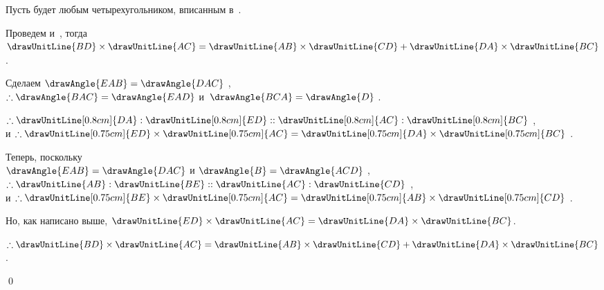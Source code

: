 \documentclass[letters,booklanguage=russian]{byrnebook}
\begin{document}
\begin{center}
Пусть  будет любым четырехугольником, вписанным в~.

Проведем  и~, тогда $\drawUnitLine{BD} \times \drawUnitLine{AC} = \drawUnitLine{AB} \times \drawUnitLine{CD} + \drawUnitLine{DA} \times \drawUnitLine{BC}$.

Сделаем $\drawAngle{EAB} = \drawAngle{DAC}$ ,\\
$\therefore \drawAngle{BAC} = \drawAngle{EAD}$ и~$\drawAngle{BCA} = \drawAngle{D}$ .

$\therefore \drawUnitLine[0.8cm]{DA} : \drawUnitLine[0.8cm]{ED} :: \drawUnitLine[0.8cm]{AC} : \drawUnitLine[0.8cm]{BC}$ ,\\
и $\therefore \drawUnitLine[0.75cm]{ED} \times \drawUnitLine[0.75cm]{AC} = \drawUnitLine[0.75cm]{DA} \times \drawUnitLine[0.75cm]{BC}$ .

Теперь, поскольку\\
$\drawAngle{EAB} = \drawAngle{DAC}$ \byref{\constref} и $\drawAngle{B} = \drawAngle{ACD}$ ,\\
$\therefore \drawUnitLine{AB} : \drawUnitLine{BE} :: \drawUnitLine{AC} : \drawUnitLine{CD}$ ,\\
и $\therefore \drawUnitLine[0.75cm]{BE} \times \drawUnitLine[0.75cm]{AC} = \drawUnitLine[0.75cm]{AB} \times \drawUnitLine[0.75cm]{CD}$ .

Но, как написано выше, $\drawUnitLine{ED} \times \drawUnitLine{AC} = \drawUnitLine{DA} \times \drawUnitLine{BC}$.

$\therefore \drawUnitLine{BD} \times \drawUnitLine{AC} = \drawUnitLine{AB} \times \drawUnitLine{CD} + \drawUnitLine{DA} \times \drawUnitLine{BC}$ .
\end{center}

\qed

\tableofcontents
\end{document}
